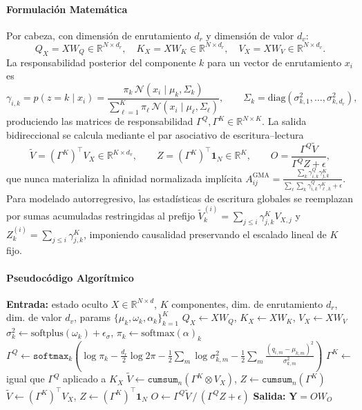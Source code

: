 \paragraph{Formulación Matemática}
Por cabeza, con dimensión de enrutamiento $d_r$ y dimensión de valor $d_v$:
\[
Q_X = X W_Q \in \mathbb{R}^{N \times d_r}, \quad
K_X = X W_K \in \mathbb{R}^{N \times d_r}, \quad
V_X = X W_V \in \mathbb{R}^{N \times d_v}.
\]
La responsabilidad posterior del componente $k$ para un vector de enrutamiento $x_i$ es
\[
\gamma_{i,k} = p(z{=}k \mid x_i) = \frac{\pi_k\, \mathcal{N}(x_i \mid \mu_k, \Sigma_k)}{\sum_{\ell=1}^{K} \pi_\ell\, \mathcal{N}(x_i \mid \mu_\ell, \Sigma_\ell)},
\qquad \Sigma_k = \mathrm{diag}(\sigma_{k,1}^2, \dots, \sigma_{k,d_r}^2),
\]
produciendo las matrices de responsabilidad $\Gamma^Q, \Gamma^K \in \mathbb{R}^{N \times K}$. La salida bidireccional se calcula mediante el par asociativo de escritura--lectura
\[
\tilde V = (\Gamma^K)^\top V_X \in \mathbb{R}^{K \times d_v}, \qquad
Z = (\Gamma^K)^\top \mathbf{1}_N \in \mathbb{R}^{K}, \qquad
O = \frac{\Gamma^Q \tilde V}{\Gamma^Q Z + \epsilon},
\]
que nunca materializa la afinidad normalizada implícita $A^{\text{GMA}}_{ij} = \frac{\sum_k \gamma^Q_{i,k} \gamma^K_{j,k}}{\sum_\ell \sum_k \gamma^Q_{i,k} \gamma^K_{\ell,k} + \epsilon}$. Para modelado autorregresivo, las estadísticas de escritura globales se reemplazan por sumas acumuladas restringidas al prefijo $\tilde V^{(i)}_k = \sum_{j \le i} \gamma^K_{j,k} V_{X,j}$ y $Z^{(i)}_k = \sum_{j \le i} \gamma^K_{j,k}$, imponiendo causalidad preservando el escalado lineal de $K$ fijo.

\paragraph{Pseudocódigo Algorítmico}
\begin{algorithmic}[1]
\State \textbf{Entrada:} estado oculto $X \in \mathbb{R}^{N \times d}$, $K$ componentes, dim. de enrutamiento $d_r$, dim. de valor $d_v$, params $\{\mu_k, \omega_k, \alpha_k\}_{k=1}^{K}$
\State $Q_X \gets X W_Q$, \quad $K_X \gets X W_K$, \quad $V_X \gets X W_V$ 
\State $\sigma^2_k \gets \text{softplus}(\omega_k) + \epsilon_\sigma$, \quad $\pi_k \gets \text{softmax}(\alpha)_k$ 
\State $\Gamma^Q \gets \texttt{softmax}_k\!\left(\log \pi_k - \tfrac{d_r}{2}\log 2\pi - \tfrac{1}{2}\sum_m \log \sigma^2_{k,m} - \tfrac{1}{2}\sum_m \frac{(q_{i,m}-\mu_{k,m})^2}{\sigma^2_{k,m}}\right)$
\State $\Gamma^K \gets$ igual que $\Gamma^Q$ aplicado a $K_X$
    \State $\tilde V \gets \texttt{cumsum}_n(\Gamma^K \otimes V_X)$, \quad $Z \gets \texttt{cumsum}_n(\Gamma^K)$ 
\Else
    \State $\tilde V \gets (\Gamma^K)^\top V_X$, \quad $Z \gets (\Gamma^K)^\top \mathbf{1}_N$ 
\EndIf
\State $O \gets \Gamma^Q \tilde V \,/\, (\Gamma^Q Z + \epsilon)$ 
\State \textbf{Salida:} $\mathbf{Y} = O W_O$
\end{algorithmic}

